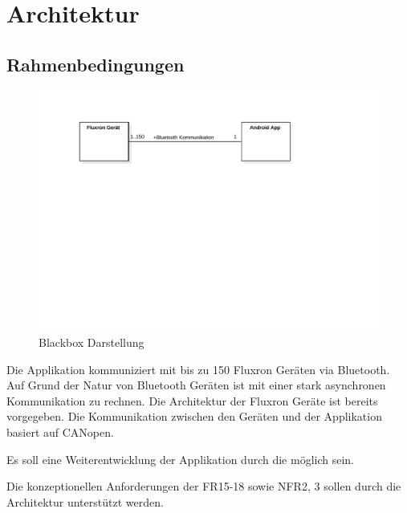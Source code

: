 \section{Architektur}
\label{sec:Architektur}

\subsection{Rahmenbedingungen}
\begin{figure}[H]
    \begin{center}
        \includegraphics[trim=30 420 140 60,clip,width=\textwidth]{design/res/blackbox}
    \end{center}
    \caption{Blackbox Darstellung}
\end{figure}

Die Applikation kommuniziert mit bis zu 150 Fluxron Geräten via Bluetooth. Auf Grund der Natur von Bluetooth Geräten ist mit einer stark asynchronen Kommunikation zu rechnen. Die Architektur der Fluxron Geräte ist bereits vorgegeben. Die Kommunikation  zwischen den Geräten und der Applikation basiert auf CANopen.

Es soll eine Weiterentwicklung der Applikation durch die \fluxron{} möglich sein.

Die konzeptionellen Anforderungen der \ac{FR}15-18 sowie \ac{NFR}2, 3 sollen durch die Architektur unterstützt werden.

